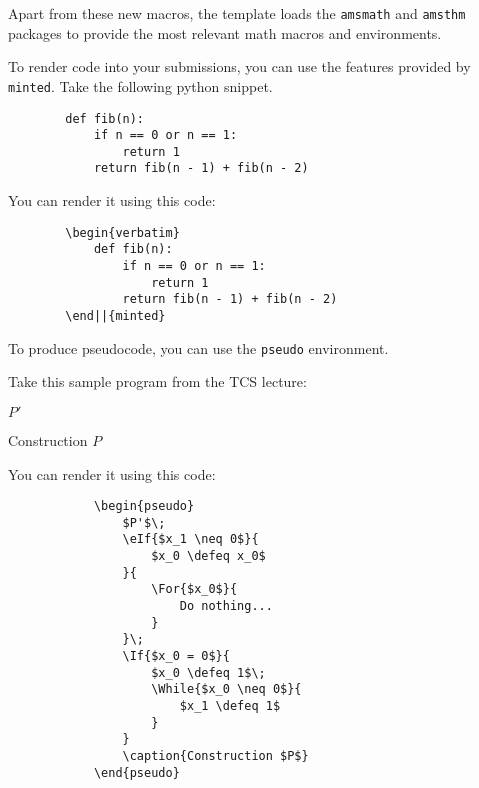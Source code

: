 \documentclass[10pt,a4paper,english]{article}
\begin{document}
    Apart from these new macros, the template loads the \verb|amsmath| and \verb|amsthm| packages to provide the most relevant math macros and environments.

    \pagebreak


    To render code into your submissions, you can use the features provided by \verb|minted|.
    Take the following python snippet.

    \begin{verbatim}
        def fib(n):
            if n == 0 or n == 1:
                return 1
            return fib(n - 1) + fib(n - 2)
    \end{verbatim}

    You can render it using this code:
    \begin{verbatim}
        \begin{verbatim}
            def fib(n):
                if n == 0 or n == 1:
                    return 1
                return fib(n - 1) + fib(n - 2)
        \end||{minted}
    \end{verbatim}

    \subex[Pseudocode]
    To produce pseudocode, you can use the \texttt{pseudo} environment.

    \begin{multicols}{2}
        Take this sample program from the TCS lecture:
        \begin{pseudo}
            $P'$\;
            \;
            \caption{Construction $P$}
        \end{pseudo}
    
        You can render it using this code:
        \begin{verbatim}
            \begin{pseudo}
                $P'$\;
                \eIf{$x_1 \neq 0$}{
                    $x_0 \defeq x_0$
                }{
                    \For{$x_0$}{
                        Do nothing...
                    }
                }\;
                \If{$x_0 = 0$}{
                    $x_0 \defeq 1$\;
                    \While{$x_0 \neq 0$}{
                        $x_1 \defeq 1$
                    }
                }
                \caption{Construction $P$}
            \end{pseudo}
        \end{verbatim}
    \end{multicols}
    
\end{document}
